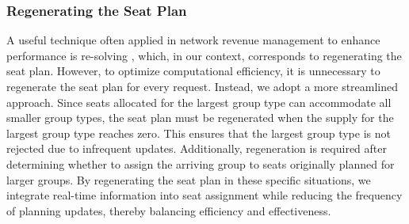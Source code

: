 



\subsubsection{Regenerating the Seat Plan}
A useful technique often applied in network revenue management to enhance performance is re-solving \citep{secomandi2008analysis, jasin2012re}, which, in our context, corresponds to regenerating the seat plan. However, to optimize computational efficiency, it is unnecessary to regenerate the seat plan for every request. Instead, we adopt a more streamlined approach. Since seats allocated for the largest group type can accommodate all smaller group types, the seat plan must be regenerated when the supply for the largest group type reaches zero. This ensures that the largest group type is not rejected due to infrequent updates. Additionally, regeneration is required after determining whether to assign the arriving group to seats originally planned for larger groups. By regenerating the seat plan in these specific situations, we integrate real-time information into seat assignment while reducing the frequency of planning updates, thereby balancing efficiency and effectiveness.

